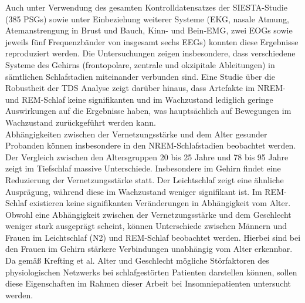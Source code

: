 Auch unter Verwendung des gesamten Kontrolldatensatzes der SIESTA-Studie (385 \acs{PSG}s) sowie unter Einbeziehung weiterer Systeme (\acs{EKG}, nasale Atmung, Atemanstrengung in Brust und Bauch, Kinn- und Bein-\acs{EMG}, zwei \acs{EOG}s sowie jeweils fünf Frequenzbänder von insgesamt sechs \acs{EEG}s) konnten diese Ergebnisse reproduziert werden. Die Untersuchungen zeigen insbesondere, dass verschiedene Systeme des Gehirns (frontopolare, zentrale und okzipitale Ableitungen) in sämtlichen Schlafstadien miteinander verbunden sind. Eine Studie über die Robustheit der \acs{TDS} Analyse zeigt darüber hinaus, dass Artefakte im \acs{NREM}- und \acs{REM}-Schlaf keine signifikanten und im Wachzustand lediglich geringe Auswirkungen auf die Ergebnisse haben, was hauptsächlich auf Bewegungen im Wachzustand zurückgeführt werden kann. \parencite{bartsch_network_2015, breuer_netzwerktopologie_2016}\\

Abhängigkeiten zwischen der Vernetzungsstärke und dem Alter gesunder Probanden können insbesondere in den \acs{NREM}-Schlafstadien beobachtet werden. Der Vergleich zwischen den Altersgruppen 20 bis 25 Jahre und 78 bis 95 Jahre zeigt im Tiefschlaf massive Unterschiede. Insbesondere im Gehirn findet eine Reduzierung der Vernetzungsstärke statt. Der Leichtschlaf zeigt eine ähnliche Ausprägung, während diese im Wachzustand weniger signifikant ist. Im \acs{REM}-Schlaf existieren keine signifikanten Veränderungen in Abhängigkeit vom Alter. Obwohl eine Abhängigkeit zwischen der Vernetzungsstärke und dem Geschlecht weniger stark ausgeprägt scheint, können Unterschiede zwischen Männern und Frauen im Leichtschlaf (N2) und \acs{REM}-Schlaf beobachtet werden. Hierbei sind bei den Frauen im Gehirn stärkere Verbindungen unabhängig vom Alter erkennbar. Da gemäß Krefting et al. Alter und Geschlecht mögliche Störfaktoren des physiologischen Netzwerks bei schlafgestörten Patienten darstellen können, sollen diese Eigenschaften im Rahmen dieser Arbeit bei Insomniepatienten untersucht werden. \parencite{krefting_altersabhangigkeit_2016, krefting_age_2017}

%
%

